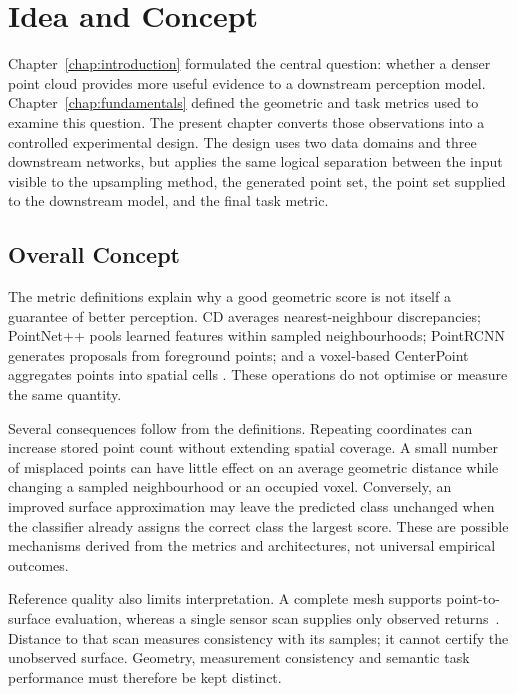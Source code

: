 \chapter{Idea and Concept}
\label{chap:concept}

Chapter~\ref{chap:introduction} formulated the central question: whether a denser point cloud provides more useful evidence to a downstream perception model. Chapter~\ref{chap:fundamentals} defined the geometric and task metrics used to examine this question. The present chapter converts those observations into a controlled experimental design. The design uses two data domains and three downstream networks, but applies the same logical separation between the input visible to the upsampling method, the generated point set, the point set supplied to the downstream model, and the final task metric.

\section{Overall Concept}
\label{sec:fc-3-1}
\label{subsec:metrics_limitations}

The metric definitions explain why a good geometric score is not itself a
guarantee of better perception. CD averages nearest-neighbour discrepancies;
PointNet++ pools learned features within sampled neighbourhoods;
PointRCNN generates proposals from foreground points; and a voxel-based
CenterPoint aggregates points into spatial cells
\cite{qian2021pugcn,shi2019pointrcnn,yin2021centerpoint,qi2017pointnetpp}.
These operations do not optimise or measure the same quantity.

Several consequences follow from the definitions. Repeating coordinates
can increase stored point count without extending spatial coverage. A
small number of misplaced points can have little effect on an average
geometric distance while changing a sampled neighbourhood or an occupied
voxel. Conversely, an improved surface approximation may leave the
predicted class unchanged when the classifier already assigns the correct
class the largest score. These are possible mechanisms derived from the
metrics and architectures, not universal empirical outcomes.

Reference quality also limits interpretation. A complete mesh supports
point-to-surface evaluation, whereas a single sensor scan supplies only
observed returns~\cite{geiger2013kitti,qian2021pugcn}. Distance to that scan
measures consistency with its samples; it cannot certify the unobserved
surface. Geometry, measurement consistency and semantic task performance
must therefore be kept distinct.

